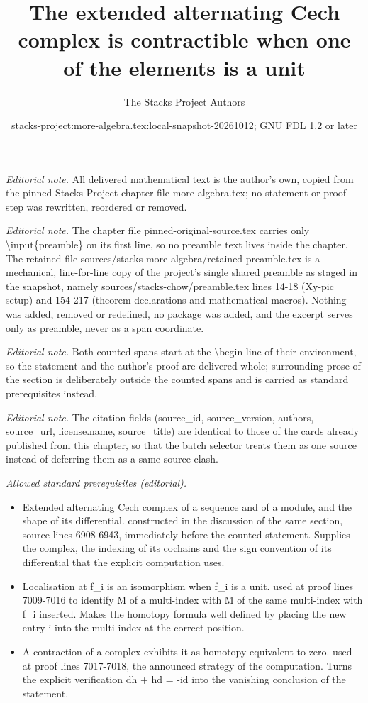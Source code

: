 \documentclass[10pt,a4paper]{amsart}
\title{The extended alternating Cech complex is contractible when one of the elements is a unit}
\author{The Stacks Project Authors}
\date{stacks-project:more-algebra.tex:local-snapshot-20261012; GNU FDL 1.2 or later}
\theoremstyle{plain}
\theoremstyle{definition}
\theoremstyle{remark}
\numberwithin{equation}{subsection}
\begin{document}
\maketitle
\setcounter{subsection}{1}
\noindent\textit{Editorial note.} All delivered mathematical text is the author's own, copied from the pinned Stacks Project chapter file more-algebra.tex; no statement or proof step was rewritten, reordered or removed.\par\medskip
\noindent\textit{Editorial note.} The chapter file pinned-original-source.tex carries only \textbackslash{}input\{preamble\} on its first line, so no preamble text lives inside the chapter. The retained file sources/stacks-more-algebra/retained-preamble.tex is a mechanical, line-for-line copy of the project's single shared preamble as staged in the snapshot, namely sources/stacks-chow/preamble.tex lines 14-18 (Xy-pic setup) and 154-217 (theorem declarations and mathematical macros). Nothing was added, removed or redefined, no package was added, and the excerpt serves only as preamble, never as a span coordinate.\par\medskip
\noindent\textit{Editorial note.} Both counted spans start at the \textbackslash{}begin line of their environment, so the statement and the author's proof are delivered whole; surrounding prose of the section is deliberately outside the counted spans and is carried as standard prerequisites instead.\par\medskip
\noindent\textit{Editorial note.} The citation fields (source\_id, source\_version, authors, source\_url, license.name, source\_title) are identical to those of the cards already published from this chapter, so that the batch selector treats them as one source instead of deferring them as a same-source clash.\par\medskip
\noindent\textit{Allowed standard prerequisites (editorial).}\begin{itemize}
\item Extended alternating Cech complex of a sequence and of a module, and the shape of its differential. constructed in the discussion of the same section, source lines 6908-6943, immediately before the counted statement. Supplies the complex, the indexing of its cochains and the sign convention of its differential that the explicit computation uses.
\item Localisation at f\_i is an isomorphism when f\_i is a unit. used at proof lines 7009-7016 to identify M of a multi-index with M of the same multi-index with f\_i inserted. Makes the homotopy formula well defined by placing the new entry i into the multi-index at the correct position.
\item A contraction of a complex exhibits it as homotopy equivalent to zero. used at proof lines 7017-7018, the announced strategy of the computation. Turns the explicit verification dh + hd = -id into the vanishing conclusion of the statement.
\end{itemize}\medskip
\end{document}
